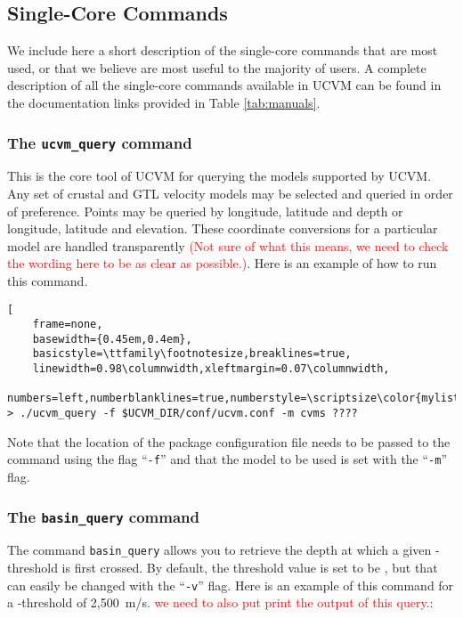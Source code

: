 

\subsection{Single-Core Commands}

We include here a short description of the single-core commands that are most used, or that we believe are most useful to the majority of users. A complete description of all the single-core commands available in UCVM can be found in the documentation links provided in Table \ref{tab:manuals}.

\subsubsection{The \textup{\texttt{ucvm\_query}} command}

This is the core tool of UCVM for querying the models supported by UCVM. Any set of crustal and GTL velocity models may be selected and queried in order of preference. Points may be queried by longitude, latitude and depth or longitude, latitude and elevation. These coordinate conversions for a particular model are handled transparently \textcolor{red}{(Not sure of what this means, we need to check the wording here to be as clear as possible.)}. Here is an example of how to run this command.

\begin{lstlisting}[
	frame=none,
	basewidth={0.45em,0.4em},
	basicstyle=\ttfamily\footnotesize,breaklines=true,
	linewidth=0.98\columnwidth,xleftmargin=0.07\columnwidth,
	numbers=left,numberblanklines=true,numberstyle=\scriptsize\color{mylistingnclr}]
> ./ucvm_query -f $UCVM_DIR/conf/ucvm.conf -m cvms ????
\end{lstlisting}

Note that the location of the package configuration file needs to be passed to the command using the flag ``\texttt{-f}'' and that the model to be used is set with the ``\texttt{-m}'' flag. 

\subsubsection{The \textup{\texttt{basin\_query}} command}

The command \texttt{basin\_query} allows you to retrieve the depth at which a given \vs{}-threshold is first crossed. By default, the threshold value is set to be , but that can easily be changed with the ``\texttt{-v}'' flag. Here is an example of this command for a \vs-threshold of 2,500~m/s. \textcolor{red}{we need to also put print the output of this query.}:

